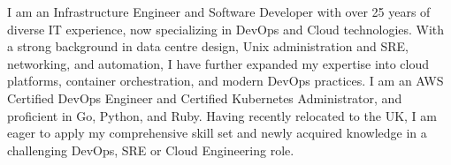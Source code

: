 
I am an Infrastructure Engineer and Software Developer with over 25 years of diverse IT experience, now specializing in DevOps and Cloud technologies. With a strong background in data centre design, Unix administration and SRE, networking, and automation, I have further expanded my expertise into cloud platforms, container orchestration, and modern DevOps practices. I am an AWS Certified DevOps Engineer and Certified Kubernetes Administrator, and proficient in Go, Python, and Ruby. Having recently relocated to the UK, I am eager to apply my comprehensive skill set and newly acquired knowledge in a challenging DevOps, SRE or Cloud Engineering role.
